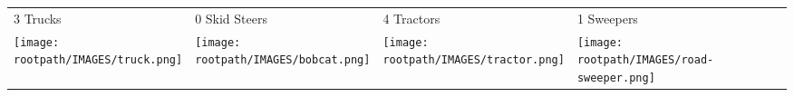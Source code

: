 \begin{tabular}{m{}m{}m{}m{}}
    {\color{ccorange} 3 Trucks} & {\color{ccorange} 0 Skid Steers} & {\color{ccorange} 4 Tractors} & {\color{ccorange} 1 Sweepers} \\
    \texttt{[image: \\rootpath/IMAGES/truck.png]}  & \texttt{[image: \\rootpath/IMAGES/bobcat.png]} & \texttt{[image: \\rootpath/IMAGES/tractor.png]} & \texttt{[image: \\rootpath/IMAGES/road-sweeper.png]}                         
    \end{tabular}